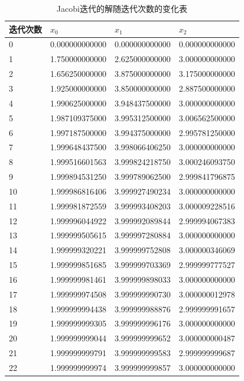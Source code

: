 \begin{table}[H]
	\centering
	\caption{Jacobi迭代的解随迭代次数的变化表}
	\begin{tabular}{llll}
		\hline
		迭代次数 & $x_0$          & $x_1$          & $x_2$          \\ \hline
		0    & 0.000000000000 & 0.000000000000 & 0.000000000000 \\
		1    & 1.750000000000 & 2.625000000000 & 3.000000000000 \\
		2    & 1.656250000000 & 3.875000000000 & 3.175000000000 \\
		3    & 1.925000000000 & 3.850000000000 & 2.887500000000 \\
		4    & 1.990625000000 & 3.948437500000 & 3.000000000000 \\
		5    & 1.987109375000 & 3.995312500000 & 3.006562500000 \\
		6    & 1.997187500000 & 3.994375000000 & 2.995781250000 \\
		7    & 1.999648437500 & 3.998066406250 & 3.000000000000 \\
		8    & 1.999516601563 & 3.999824218750 & 3.000246093750 \\
		9    & 1.999894531250 & 3.999789062500 & 2.999841796875 \\
		10   & 1.999986816406 & 3.999927490234 & 3.000000000000 \\
		11   & 1.999981872559 & 3.999993408203 & 3.000009228516 \\
		12   & 1.999996044922 & 3.999992089844 & 2.999994067383 \\
		13   & 1.999999505615 & 3.999997280884 & 3.000000000000 \\
		14   & 1.999999320221 & 3.999999752808 & 3.000000346069 \\
		15   & 1.999999851685 & 3.999999703369 & 2.999999777527 \\
		16   & 1.999999981461 & 3.999999898033 & 3.000000000000 \\
		17   & 1.999999974508 & 3.999999990730 & 3.000000012978 \\
		18   & 1.999999994438 & 3.999999988876 & 2.999999991657 \\
		19   & 1.999999999305 & 3.999999996176 & 3.000000000000 \\
		20   & 1.999999999044 & 3.999999999652 & 3.000000000487 \\
		21   & 1.999999999791 & 3.999999999583 & 2.999999999687 \\
		22   & 1.999999999974 & 3.999999999857 & 3.000000000000 \\

\end{tabular}
\end{table}
